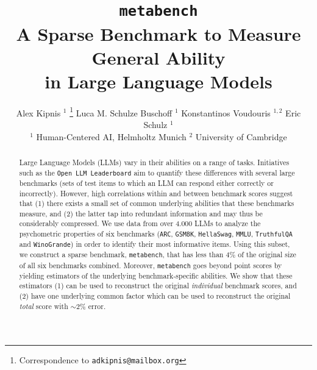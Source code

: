 \documentclass{article}
\title{\texttt{metabench}\\A Sparse Benchmark to Measure General Ability\\in Large Language Models}
\author{%
   Alex Kipnis $^{1}$ \thanks{Correspondence to \texttt{adkipnis@mailbox.org}} \quad
   Luca M. Schulze Buschoff $^{1}$ \quad
   Konstantinos Voudouris $^{1,2}$ \quad
   Eric Schulz $^1$\\
   $^1$ Human-Centered AI, Helmholtz Munich \quad $^2$ University of Cambridge\\
}
\begin{document}
\maketitle

\begin{abstract}
   Large Language Models (LLMs) vary in their abilities on a range of tasks. Initiatives such as the \texttt{Open LLM Leaderboard} aim to quantify these differences with several large benchmarks (sets of test items to which an LLM can respond either correctly or incorrectly).
   However, high correlations within and between benchmark scores suggest that (1) there exists a small set of common underlying abilities that these benchmarks measure, and (2) the latter tap into redundant information and may thus be considerably compressed.
   We use data from over $4.000$ LLMs to analyze the psychometric properties of six benchmarks (\texttt{ARC}, \texttt{GSM8K}, \texttt{HellaSwag}, \texttt{MMLU}, \texttt{TruthfulQA} and \texttt{WinoGrande}) in order to identify their most informative items.
   Using this subset, we construct a sparse benchmark, \texttt{metabench}, that has less than $4$\% of the original size of all six benchmarks combined. Moreover, \texttt{metabench} goes beyond point scores by yielding estimators of the underlying benchmark-specific abilities.
   We show that these estimators (1) can be used to reconstruct the original \textit{individual} benchmark scores, and (2) have one underlying common factor which can be used to reconstruct the original \textit{total} score with $\sim 2$\% error.
\end{abstract}
\end{document}
